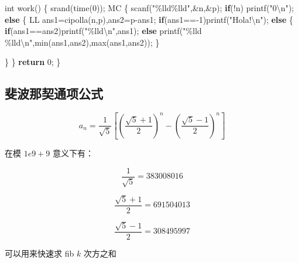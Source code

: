 \documentclass[
]{article}
\newenvironment{Shaded}{}{}
\newcommand{\ControlFlowTok}[1]{\textcolor[rgb]{0.00,0.44,0.13}{\textbf{#1}}}
\newcommand{\DataTypeTok}[1]{\textcolor[rgb]{0.56,0.13,0.00}{#1}}
\newcommand{\DecValTok}[1]{\textcolor[rgb]{0.25,0.63,0.44}{#1}}
\newcommand{\NormalTok}[1]{#1}
\newcommand{\SpecialCharTok}[1]{\textcolor[rgb]{0.25,0.44,0.63}{#1}}
\newcommand{\StringTok}[1]{\textcolor[rgb]{0.25,0.44,0.63}{#1}}
\begin{document}
\begin{Shaded}
\begin{Highlighting}[]
\DataTypeTok{int}\NormalTok{ work()}
\NormalTok{\{}
\NormalTok{    srand(time(}\DecValTok{0}\NormalTok{));}
\NormalTok{    MC}
\NormalTok{    \{}
\NormalTok{        scanf(}\StringTok{"}\SpecialCharTok{\%lld\%lld}\StringTok{"}\NormalTok{,\&n,\&p);}
        \ControlFlowTok{if}\NormalTok{(!n) printf(}\StringTok{"0}\SpecialCharTok{\textbackslash{}n}\StringTok{"}\NormalTok{);}
        \ControlFlowTok{else}
\NormalTok{        \{}
\NormalTok{            LL ans1=cipolla(n,p),ans2=p{-}ans1;}
            \ControlFlowTok{if}\NormalTok{(ans1=={-}}\DecValTok{1}\NormalTok{)printf(}\StringTok{"Hola!}\SpecialCharTok{\textbackslash{}n}\StringTok{"}\NormalTok{);}
            \ControlFlowTok{else}
\NormalTok{            \{}
                \ControlFlowTok{if}\NormalTok{(ans1==ans2)printf(}\StringTok{"}\SpecialCharTok{\%lld\textbackslash{}n}\StringTok{"}\NormalTok{,ans1);}
                \ControlFlowTok{else}\NormalTok{ printf(}\StringTok{"}\SpecialCharTok{\%lld}\StringTok{ }\SpecialCharTok{\%lld\textbackslash{}n}\StringTok{"}\NormalTok{,min(ans1,ans2),max(ans1,ans2));}
\NormalTok{            \}}

\NormalTok{        \}}
\NormalTok{    \}}
    \ControlFlowTok{return} \DecValTok{0}\NormalTok{;}
\NormalTok{\}}
\end{Highlighting}
\end{Shaded}

\hypertarget{ux6590ux6ce2ux90a3ux5951ux901aux9879ux516cux5f0f}{%
\subsection{斐波那契通项公式}\label{ux6590ux6ce2ux90a3ux5951ux901aux9879ux516cux5f0f}}

\[
a_n=\frac{1}{\sqrt{5}}[(\frac{\sqrt{5}+1}{2})^n-(\frac{\sqrt{5}-1}{2})^n]
\]

在模 \(1e9+9\) 意义下有：

\[\frac{1}{\sqrt{5}} = 383008016\]

\[\frac{\sqrt{5}+1}{2} = 691504013\]

\[\frac{\sqrt{5}-1}{2} = 308495997\]

可以用来快速求 fib \(k\) 次方之和
\end{document}
